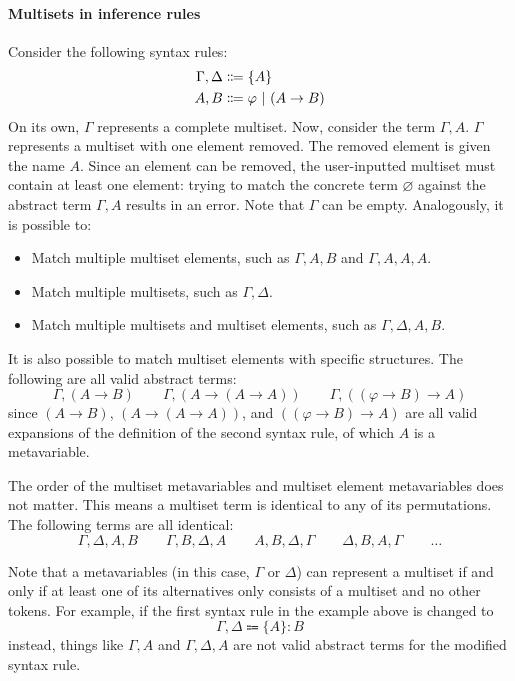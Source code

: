 \paragraph{Multisets in inference rules}
\label{inference:multisets}
Consider the following syntax rules:
\begin{align*}
    \Gamma, \Delta &\Coloneqq \{ A \} \\
    A, B &\Coloneqq \varphi \ |\  (A \to B)
\end{align*}
On its own, $\Gamma$ represents a complete multiset. Now, consider the term $\Gamma, A$. $\Gamma$ represents a multiset with one element removed. The removed element is given the name $A$. Since an element can be removed, the user-inputted multiset must contain at least one element: trying to match the concrete term $\varnothing$ against the abstract term $\Gamma, A$ results in an error. Note that $\Gamma$ can be empty. Analogously, it is possible to:
\begin{itemize}
    \item Match multiple multiset elements, such as $\Gamma, A, B$ and $\Gamma, A, A, A$.
    \item Match multiple multisets, such as $\Gamma, \Delta$.
    \item Match multiple multisets and multiset elements, such as $\Gamma, \Delta, A, B$.
\end{itemize}

It is also possible to match multiset elements with specific structures. The following are all valid abstract terms:
\[
    \Gamma, (A \to B) \qquad \Gamma, (A \to (A \to A)) \qquad \Gamma, ((\varphi \to B) \to A)
\]
since $(A \to B)$, $(A \to (A \to A))$, and $((\varphi \to B) \to A)$ are all valid expansions of the definition of the second syntax rule, of which $A$ is a metavariable.

The order of the multiset metavariables and multiset element metavariables does not matter. This means a multiset term is identical to any of its permutations. The following terms are all identical:
\[
    \Gamma, \Delta, A, B \qquad \Gamma, B, \Delta, A \qquad A, B, \Delta, \Gamma \qquad \Delta, B, A, \Gamma \qquad \ldots
\]

Note that a metavariables (in this case, $\Gamma$ or $\Delta$) can represent a multiset if and only if at least one of its alternatives only consists of a multiset and no other tokens. For example, if the first syntax rule in the example above is changed to
\[
    \Gamma, \Delta \Coloneqq \{ A \}: B
\]
instead, things like $\Gamma, A$ and $\Gamma, \Delta, A$ are not valid abstract terms for the modified syntax rule.

